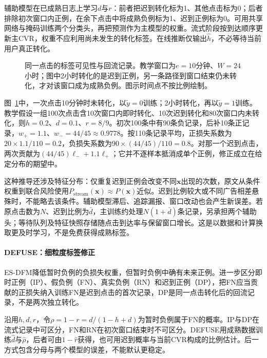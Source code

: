 辅助模型在已成熟日志上学习$d$与$r$：前者把迟到转化标为1、其他点击标为0；后者排除初次窗口内正例，在余下点击中将成熟负例标为1、迟到正例标为0。可用共享网络与掩码训练两个分类头，再把预测作为主模型的权重。流式阶段按到达顺序更新主CVR，权重不应利用尚未发生的转化标签。在线推断仅输出$\widehat h$，不必等待当前用户真正转化。

\begin{figure}[htbp]
  \centering
  
  \caption{同一点击的标签可见性与回流记录。教学窗口为$e=10$分钟、$W=24$小时；图中2小时转化的是迟到正例，另一条路径到窗口结束仍未转化，才对该窗口成为成熟负例。图示时间点不按比例绘制。}
  \label{fig:rs-advertising-delay}
\end{figure}

图~\ref{fig:rs-advertising-delay}中，一次点击10分钟时未转化，以$\widetilde y=0$训练；2小时转化，再以$\widetilde y=1$训练。教学假设一组100次点击含10次窗口内即时转化、10次迟到转化和80次窗口内未转化，则$h=0.2$、$d=0.1$、$r=8/9$。初次100条中有90条负记录，后补10条正记录，$w_+=1.1$、$w_-=44/45\approx0.9778$。按110条记录平均，正损失系数为$20\times1.1/110=0.2$，负损失系数为$90\times(44/45)/110=0.8$。对那一个迟到点击，两次贡献为$(44/45)\ell_-+1.1\ell_+$；它并不逐样本抵消成单个正例，修正成立在给定分布的期望中。

这种推导还涉及特征分布：仅重复迟到正例会改变不同$\bm{x}$出现的次数，原文从条件权重到联合风险使用$P_{\mathrm{stream}}(\bm{x})\approx P(\bm{x})$近似。迟到比例较大或不同广告相差悬殊时，不能略去该条件。辅助模型滞后、追踪漏报、窗口改动也会产生新误差。若原点击数为$N$、迟到比例为$\bar d$，主训练约处理$N(1+\bar d)$条记录，另承担两个辅助头；等待队列及特征快照存储随点击到达率与保留窗口增长。这是以数据和计算换取更及时学习，不是免费获得成熟标签。

\paragraph{DEFUSE：细粒度标签修正}
\label{sec:rs-advertising-defuse}

ES-DFM降低暂时负例的负损失权重，但暂时负例中确有未来正例。进一步区分即时正例（IP）、假负例（FN）、真实负例（RN）和迟到正例（DP），把FN应当贡献的正损失纳入训练FN是迟到点击的首次记录，DP是同一点击转化后的回流记录，不是两次独立转化。

沿用$h,d,r$，令$\rho=1-r=d/(1-h+d)$为暂时负例属于FN的概率。IP与DP在流式记录中可区分，FN和RN在初次窗口结束时不可区分。DEFUSE用成熟数据训练$\widehat d$与$\widehat\rho$，后者可由$1-\widehat r$获得，也可用迟到概率与当前CVR构成的比例估计。后一方式包含分母与两个模型的误差，不能默认更稳定。

